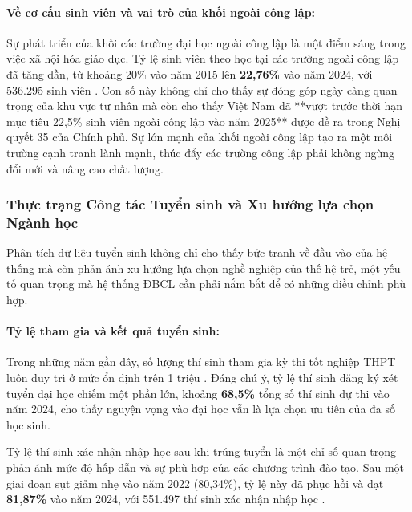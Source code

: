 \documentclass[12pt, a4paper, openany]{report}
\begin{document}
\paragraph{Về cơ cấu sinh viên và vai trò của khối ngoài công lập:}
Sự phát triển của khối các trường đại học ngoài công lập là một điểm sáng trong việc xã hội hóa giáo dục. Tỷ lệ sinh viên theo học tại các trường ngoài công lập đã tăng dần, từ khoảng 20\% vào năm 2015 lên \textbf{22,76\%} vào năm 2024, với 536.295 sinh viên \cite{stat_moet_2024}. Con số này không chỉ cho thấy sự đóng góp ngày càng quan trọng của khu vực tư nhân mà còn cho thấy Việt Nam đã **vượt trước thời hạn mục tiêu 22,5\% sinh viên ngoài công lập vào năm 2025** được đề ra trong Nghị quyết 35 của Chính phủ. Sự lớn mạnh của khối ngoài công lập tạo ra một môi trường cạnh tranh lành mạnh, thúc đẩy các trường công lập phải không ngừng đổi mới và nâng cao chất lượng.

\subsubsection{Thực trạng Công tác Tuyển sinh và Xu hướng lựa chọn Ngành học}

Phân tích dữ liệu tuyển sinh không chỉ cho thấy bức tranh về đầu vào của hệ thống mà còn phản ánh xu hướng lựa chọn nghề nghiệp của thế hệ trẻ, một yếu tố quan trọng mà hệ thống ĐBCL cần phải nắm bắt để có những điều chỉnh phù hợp.

\paragraph{Tỷ lệ tham gia và kết quả tuyển sinh:}
Trong những năm gần đây, số lượng thí sinh tham gia kỳ thi tốt nghiệp THPT luôn duy trì ở mức ổn định trên 1 triệu \cite{stat_tuyen_sinh_2024_so_lieu, stat_thi_sinh_2024}. Đáng chú ý, tỷ lệ thí sinh đăng ký xét tuyển đại học chiếm một phần lớn, khoảng \textbf{68,5\%} tổng số thí sinh dự thi vào năm 2024, cho thấy nguyện vọng vào đại học vẫn là lựa chọn ưu tiên của đa số học sinh.

Tỷ lệ thí sinh xác nhận nhập học sau khi trúng tuyển là một chỉ số quan trọng phản ánh mức độ hấp dẫn và sự phù hợp của các chương trình đào tạo. Sau một giai đoạn sụt giảm nhẹ vào năm 2022 (80,34\%), tỷ lệ này đã phục hồi và đạt \textbf{81,87\%} vào năm 2024, với 551.497 thí sinh xác nhận nhập học \cite{stat_nhap_hoc_2024, stat_tuyen_sinh_2024_so_lieu}. 
\end{document}
